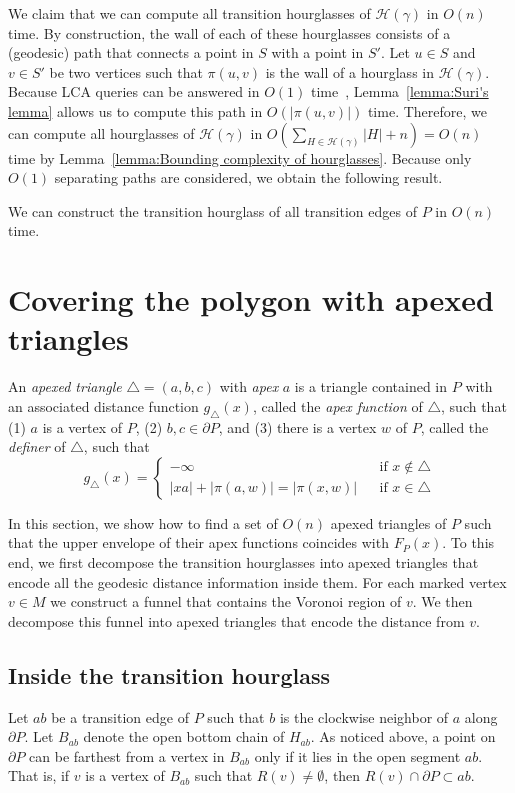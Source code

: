 \documentclass[a4paper,UKenglish]{lipics}
\newcommand{\F}[2]{\ensuremath{F_{\scriptscriptstyle #1}(#2)}}
\newcommand{\g}[2]{\ensuremath{|\pi(#1, #2)|}}
\newcommand{\p}[2]{\ensuremath{\pi(#1, #2)}}
\begin{document}
We claim that we can compute all transition hourglasses of $\mathcal H(\gamma)$ in $O(n)$ time.
By construction, the wall of each of these hourglasses consists of a (geodesic) path that connects a point in $S$ with a point in $S'$. Let $u\in S$ and $v\in S'$ be two vertices such that $\p{u}{v}$ is the wall of a hourglass in $\mathcal H(\gamma)$.
Because LCA queries can be answered in $O(1)$ time~\cite{harel1984fast}, 
Lemma~\ref{lemma:Suri's lemma} allows us to compute this path in $O(|\p{u}{v}|)$ time. 
Therefore, we can compute all hourglasses of $\mathcal H(\gamma)$ in $O(\sum_{H\in \mathcal H(\gamma)} |H| + n) = O(n)$ time by Lemma~\ref{lemma:Bounding complexity of hourglasses}. 
Because only $O(1)$ separating paths are considered, we obtain the following result.

\begin{lemma}\label{lemma: Hourglass partition}
We can construct the transition hourglass of all transition edges of $P$ in $O(n)$ time.
\end{lemma}

\section{Covering the polygon with apexed triangles}\label{Section:Computing apexed triangles}
An \emph{apexed triangle} $\triangle = (a,b,c)$ with \emph{apex} $a$ is a triangle contained in $P$ with an associated distance function $g_\triangle(x)$, called the \emph{apex function} of $\triangle$, such that (1) $a$ is a vertex of $P$, (2) $b,c \in\partial P$, and (3) there is a  vertex $w$ of  $P$, called the \emph{definer} of $\triangle$, such that
$$g_\triangle(x) = \left\{ \begin{array}{lll}
-\infty&&\text{if $x\notin \triangle$}\\
|xa| + \g{a}{w} = \g{x}{w} && \text{if $x\in \triangle$}
\end{array}\right.$$

In this section, we show how to find a set of $O(n)$ apexed triangles of $P$ such that the upper envelope of their apex functions coincides with $\F{P}{x}$.
To this end, we first decompose the transition hourglasses into apexed triangles that encode all the geodesic distance information inside them. For each marked vertex $v\in M$ we construct a funnel that contains the Voronoi region of $v$.  We then decompose this funnel into apexed triangles that encode the distance from $v$.

\subsection{Inside the transition hourglass}
Let $ab$ be a transition edge of $P$  such that $b$ is the clockwise neighbor of $a$ along $\partial P$.
Let $B_{ab}$ denote the open bottom chain of $H_{ab}$.
As noticed above, a point on $\partial P$ can be farthest from a vertex in $B_{ab}$ only if it lies in the open segment $ab$.
That is, if $v$ is a vertex of $B_{ab}$ such that $R(v)\neq \emptyset$, then $R(v)\cap \partial P \subset ab$.
\end{document}
